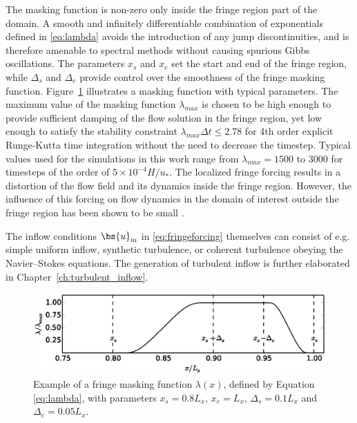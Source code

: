 The masking function is non-zero only inside the fringe region part of the domain. A smooth and infinitely differentiable combination of exponentials defined in \eqref{eq:lambda} avoids the introduction of any jump discontinuities, and is therefore amenable to spectral methods without causing spurious Gibbs oscillations. The parameters $x_s$ and $x_e$ set the start and end of the fringe region, while $\Delta_s$ and $\Delta_e$ provide control over the smoothness of the fringe masking function. Figure~\ref{fig:lambda} illustrates a masking function with typical parameters. The maximum value of the masking function $\lambda_{max}$ is chosen to be high enough to provide sufficient damping of the flow solution in the fringe region, yet low enough to satisfy the stability constraint $\lambda_{max}\Delta t \le 2.78$ for 4th order explicit Runge-Kutta time integration \citep{schlatter2005windowing} without the need to decrease the timestep. Typical values used for the simulations in this work range from $\lambda_{max} = 1 500$ to $3 000$ for timesteps of the order of $5 \times 10^{-4} H/u_*$. The localized fringe forcing results in a distortion of the flow field and its dynamics inside the fringe region. However, the influence of this forcing on flow dynamics in the domain of interest outside the fringe region has been shown to be small \citep{nordstrom1999fringe}.

The inflow conditions $\bs{u}_{\text{in}}$ in \eqref{eq:fringeforcing} themselves can consist of e.g. simple uniform inflow, synthetic turbulence, or coherent turbulence obeying the Navier--Stokes equations. The generation of turbulent inflow is further elaborated in Chapter~\ref{ch:turbulent_inflow}. 

\begin{figure}[t]
	\centering
	\includegraphics[width = \textwidth,trim= 0cm 4.4cm 0cm 5cm,clip]{chapters/methodology/lambda_fringefunction.eps}
	\caption{Example of a fringe masking function $\lambda(x)$, defined by Equation \eqref{eq:lambda}, with parameters $x_{s} = 0.8L_x$, $x_{e} = L_x$, $\Delta_{s} = 0.1L_x$ and $\Delta_{e} = 0.05L_x$.}
	\label{fig:lambda}
\end{figure}	



